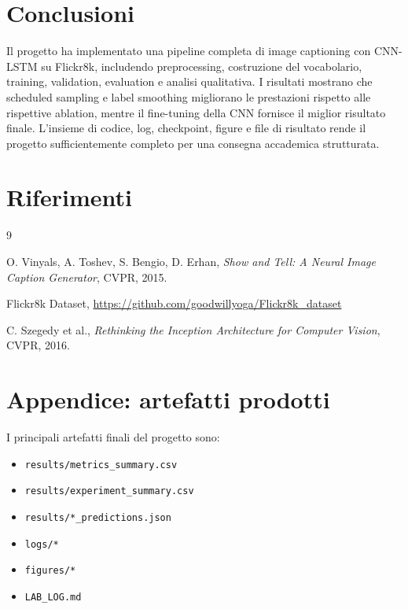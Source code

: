 \documentclass[12pt,a4paper]{article}
\begin{document}
\section{Conclusioni}

Il progetto ha implementato una pipeline completa di image captioning con CNN-LSTM su Flickr8k, includendo preprocessing, costruzione del vocabolario, training, validation, evaluation e analisi qualitativa. I risultati mostrano che scheduled sampling e label smoothing migliorano le prestazioni rispetto alle rispettive ablation, mentre il fine-tuning della CNN fornisce il miglior risultato finale. L'insieme di codice, log, checkpoint, figure e file di risultato rende il progetto sufficientemente completo per una consegna accademica strutturata.

\section*{Riferimenti}

\begin{thebibliography}{9}

O. Vinyals, A. Toshev, S. Bengio, D. Erhan,
\textit{Show and Tell: A Neural Image Caption Generator},
CVPR, 2015.

Flickr8k Dataset,
\url{https://github.com/goodwillyoga/Flickr8k_dataset}

C. Szegedy et al.,
\textit{Rethinking the Inception Architecture for Computer Vision},
CVPR, 2016.

\end{thebibliography}

\section*{Appendice: artefatti prodotti}

I principali artefatti finali del progetto sono:
\begin{itemize}[leftmargin=*]
    \item \texttt{results/metrics\_summary.csv}
    \item \texttt{results/experiment\_summary.csv}
    \item \texttt{results/*\_predictions.json}
    \item \texttt{logs/*}
    \item \texttt{figures/*}
    \item \texttt{LAB\_LOG.md}
\end{itemize}
\end{document}
